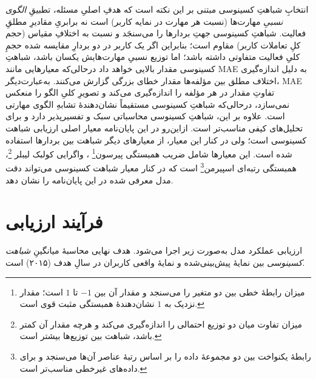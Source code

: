   انتخابِ شباهتِ کسینوسی مبتنی بر این نکته است که هدفِ اصلیِ مسئله، تطبیقِ \emph{الگوی نسبیِ} مهارت‌ها (نسبت هر مهارت در نمایه کاربر) است نه برابریِ مقادیرِ مطلقِ فعالیت. شباهتِ کسینوسی جهتِ بردارها را می‌سنجَد و نسبت به اختلافِ مقیاس (حجم کلِ تعاملات کاربر) مقاوم است؛ بنابراین اگر یک کاربر در دو بردارِ مقایسه شده حجمِ کلیِ فعالیت متفاوتی داشته باشد؛ اما توزیع نسبیِ مهارت‌هایش یکسان باشد، شباهتِ کسینوسی مقدار بالایی خواهد داد درحالی‌که معیارهایی مانند MAE به دلیل اندازه‌گیری اختلاف مطلق بین مؤلفه‌ها مقدار خطای بزرگی گزارش می‌کنند. به‌عبارت‌دیگر، MAE تفاوتِ مقدار در هر مؤلفه را اندازه‌گیری می‌کند و تصویرِ کلیِ الگو را منعکس نمی‌سازد، درحالی‌که شباهتِ کسینوسی مستقیماً نشان‌دهندۀ تشابهِ الگوی مهارتی است. علاوه بر این، شباهتِ کسینوسی محاسباتی سبک و تفسیرپذیر دارد و برای تحلیل‌های کیفی مناسب‌تر است. ازاین‌رو در این پایان‌نامه معیار اصلی ارزیابی شباهت کسینوسی است؛ ولی در کنار این معیار، از معیارهای دیگر شباهت بین بردارها استفاده شده است. این معیارها شامل ضریب همبستگی پیرسون\footnote{میزان رابطهٔ خطی بین دو متغیر را می‌سنجد و مقدار آن بین $-1$ تا $1$ است؛ مقدار نزدیک به $1$ نشان‌دهندهٔ همبستگی مثبت قوی است. } ، واگرایی کولبک لیبلر \footnote{میزان تفاوت میان دو توزیع احتمالی را اندازه‌گیری می‌کند و هرچه مقدار آن کمتر باشد، شباهت بین توزیع‌ها بیشتر است.}، همبستگی رتبه‌ای اسپیرمن\footnote{رابطهٔ یکنواخت بین دو مجموعهٔ داده را بر اساس رتبهٔ عناصر آن‌ها می‌سنجد و برای داده‌های غیرخطی مناسب‌تر است.} است که در کنار معیار شباهت کسینوسی می‌تواند دقت مدل معرفی شده در این پایان‌نامه را نشان دهد.

   
\section{فرآیند ارزیابی}
\label{sec:eval-process}

ارزیابی عملکرد مدل به‌صورت زیر اجرا می‌شود. هدف نهایی محاسبهٔ میانگینِ \emph{شباهت کسینوسی} بین نمایهٔ پیش‌بینی‌شده و نمایهٔ واقعی کاربران در سالِ هدف (۲۰۱۵) است.

